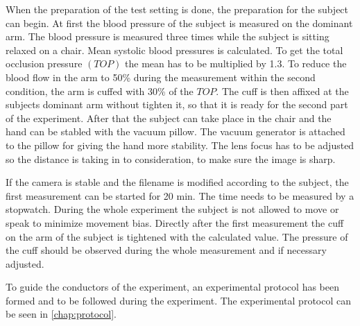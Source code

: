 When the preparation of the test setting is done, the preparation for the subject can begin. At first the blood pressure of the subject is measured on the dominant arm. The blood pressure is measured three times while the subject is sitting relaxed on a chair. Mean systolic blood pressures is calculated. To get the total occlusion pressure $(TOP)$ the mean has to be multiplied by 1.3. To reduce the blood flow in the arm to 50\% during the measurement within the second condition, the arm is cuffed with 30\% of the $TOP$.\cite{mouser2017} 
The cuff is then affixed at the subjects dominant arm without tighten it, so that it is ready for the second part of the experiment. After that the subject can take place in the chair and the hand can be stabled with the vacuum pillow. The vacuum generator is attached to the pillow for giving the hand more stability. The lens focus has to be adjusted so the distance is taking in to consideration, to make sure the image is sharp.

If the camera is stable and the filename is modified according to the subject, the first measurement can be started for 20 min. The time needs to be measured by a stopwatch. During the whole experiment the subject is not allowed to move or speak to minimize movement bias.
Directly after the first measurement the cuff on the arm of the subject is tightened with the calculated value. The pressure of the cuff should be observed during the whole measurement and if necessary adjusted.

To guide the conductors of the experiment, an experimental protocol has been formed and to be followed during the experiment. The experimental protocol can be seen in \cref{chap:protocol}. 

